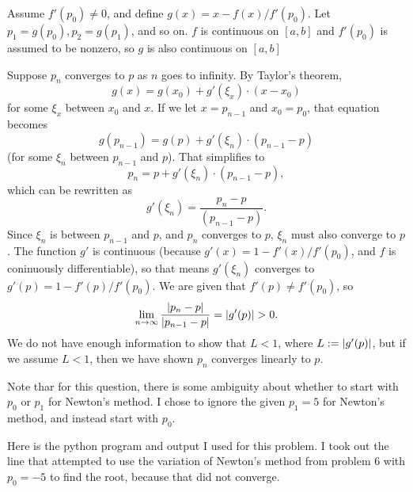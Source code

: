 \documentclass{article}
\begin{document}
\bigskip
\begin{prob}
\end{prob}
Assume $f'(p_0) \neq 0$, and define $g(x) = x - f(x) / f'(p_0)$. Let $p_1 = g(p_0), p_2 = g(p_1)$, and so on. $f$ is continuous on $[a,b]$ and $f'(p_0)$ is assumed to be nonzero, so $g$ is also continuous on $[a,b]$
\par
Suppose $p_n$ converges to $p$ as $n$ goes to infinity. By Taylor's theorem,
\[ g(x) = g(x_0) + g'(\xi_x) \cdot (x - x_0) \]
for some $\xi_x$ between $x_0$ and $x$. If we let $x = p_{n-1}$ and $x_0 = p_0$, that equation becomes
\[ g(p_{n-1}) = g(p) + g'(\xi_n) \cdot (p_{n-1} - p) \]
(for some $\xi_n$ between $p_{n-1}$ and $p$). That simplifies to
\[ p_n = p + g'(\xi_n) \cdot (p_{n-1} - p), \]
which can be rewritten as
\[ g'(\xi_n) = \frac{p_n - p}{(p_{n-1} - p)}. \]
Since $\xi_n$ is between $p_{n-1}$ and $p$, and $p_n$ converges to $p$, $\xi_n$ must also converge to $p$. The function $g'$ is continuous (because $g'(x) = 1 - f'(x) / f'(p_0)$, and $f$ is coninuously differentiable), so that means $g'(\xi_n)$ converges to $g'(p) = 1 - f'(p) / f'(p_0)$. We are given that $f'(p) \neq f'(p_0)$, so
\[ \lim_{n \rightarrow \infty} \frac{\left\lvert p_n-p \right\rvert}{\left\lvert p_{n-1}-p \right\rvert} = \left\lvert g'(p) \right\rvert > 0. \]
We do not have enough information to show that $L < 1$, where $L := \left\lvert g'(p) \right\rvert$, but if we assume $L < 1$, then we have shown $p_n$ converges linearly to $p$.
\bigskip
\begin{prob}
\end{prob}
Note thar for this question, there is some ambiguity about whether to start with $p_0$ or $p_1$ for Newton's method. I chose to ignore the given $p_1=5$ for Newton's method, and instead start with $p_0$.
\par
Here is the python program and output I used for this problem. I took out the line that attempted to use the variation of Newton's method from problem 6 with $p_0=-5$ to find the root, because that did not converge.
\end{document}
